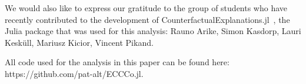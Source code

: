 \documentclass[letterpaper]{article} %
\begin{document}
We would also like to express our gratitude to the group of students who have recently contributed to the development of CounterfactualExplanations.jl~\citep{altmeyer2023explaining}, the Julia package that was used for this analysis: Rauno Arike, Simon Kasdorp, Lauri Kesküll, Mariusz Kicior, Vincent Pikand.

All code used for the analysis in this paper can be found here: https://github.com/pat-alt/ECCCo.jl.


\end{document}
